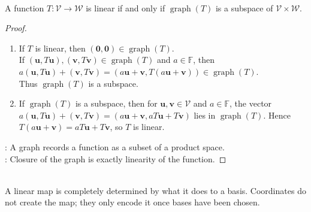 \begin{proposition} \label{prop:graph-subspace-characterizes-linearity} \\
A function $T:\mathcal{V}\to\mathcal{W}$ is linear if and only if $\operatorname{graph}(T)$ is a subspace of $\mathcal{V}\times\mathcal{W}$.
\begin{proof}
\begin{enumerate}[label=(\roman*)]
\setlength{\itemsep}{0pt}
\item[$(\Rightarrow)$] If $T$ is linear, then $(\mathbf{0},\mathbf{0})\in\operatorname{graph}(T)$.\\
If $(\mathbf{u},T\mathbf{u}),(\mathbf{v},T\mathbf{v})\in\operatorname{graph}(T)$ and $a\in\mathbb{F}$, then $a(\mathbf{u},T\mathbf{u})+(\mathbf{v},T\mathbf{v})=(a\mathbf{u}+\mathbf{v},T(a\mathbf{u}+\mathbf{v}))\in\operatorname{graph}(T)$.\\
Thus $\operatorname{graph}(T)$ is a subspace.
\item[$(\Leftarrow)$] If $\operatorname{graph}(T)$ is a subspace, then for $\mathbf{u},\mathbf{v}\in\mathcal{V}$ and $a\in\mathbb{F}$, the vector
$a(\mathbf{u},T\mathbf{u})+(\mathbf{v},T\mathbf{v})=(a\mathbf{u}+\mathbf{v},aT\mathbf{u}+T\mathbf{v})$
lies in $\operatorname{graph}(T)$. Hence $T(a\mathbf{u}+\mathbf{v})=aT\mathbf{u}+T\mathbf{v}$, so $T$ is linear.
\end{enumerate}
: A graph records a function as a subset of a product space.\\
: Closure of the graph is exactly linearity of the function.
\end{proof}
\end{proposition}

\begin{principle} \\
A linear map is completely determined by what it does to a basis. Coordinates do not create the map; they only encode it once bases have been chosen.
\end{principle}


